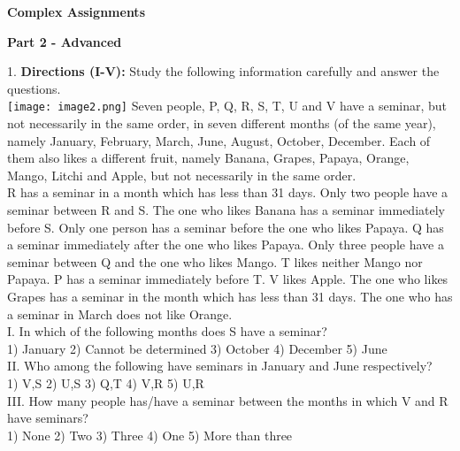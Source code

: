 \documentclass[
]{article}
\author{}
\date{}
\begin{document}
	
 

\begin{center}
	{\Large \textbf{Complex Assignments \\}}
\end{center}

{\large \textbf{ Part 2 - Advanced \\}}

1. \textbf{Directions (I-V):} Study the following information carefully and answer the questions.\\
\texttt{[image: image2.png]}
Seven people, P, Q, R, S, T, U and V have a seminar, but not necessarily in the same order, in
seven different months (of the same year), namely January, February, March, June, August,
October, December. Each of them also likes a different fruit, namely Banana, Grapes,
Papaya, Orange, Mango, Litchi and Apple, but not necessarily in the same order.\\
R has a seminar in a month which has less than 31 days. Only two people have a seminar
between R and S. The one who likes Banana has a seminar immediately before S. Only one
person has a seminar before the one who likes Papaya. Q has a seminar immediately after
the one who likes Papaya. Only three people have a seminar between Q and the one who
likes Mango. T likes neither Mango nor Papaya. P has a seminar immediately before T. V
likes Apple. The one who likes Grapes has a seminar in the month which has less than 31
days. The one who has a seminar in March does not like Orange.\\

I. In which of the following months does S have a seminar?\\
1) January \hspace{2mm}2) Cannot be determined \hspace{2mm}3) October
\hspace{2mm}4) December \hspace{2mm}5) June\\

II. Who among the following have seminars in January and June respectively?\\
1) V,S \hspace{2mm}2) U,S \hspace{2mm}3) Q,T \hspace{2mm}4) V,R \hspace{2mm}5) U,R\\

III. How many people has/have a seminar between the months in which V and R have
seminars?\\
1) None \hspace{2mm}2) Two \hspace{2mm}3) Three \hspace{2mm}4) One \hspace{2mm}5) More than three\\
\end{document}
